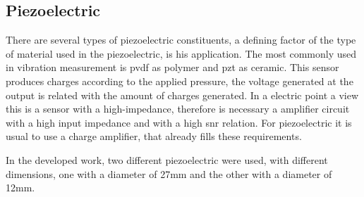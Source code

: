 \subsection{Piezoelectric}

There are several types of piezoelectric constituents, a defining factor of the type of material used in the piezoelectric, is his application. The most commonly used in vibration measurement is \acrshort{pvdf} as polymer and \acrshort{pzt} as ceramic. This sensor produces charges according to the applied pressure, the voltage generated at the output is related with the amount of charges generated. In a electric point a view this is a sensor with a high-impedance, therefore is necessary a amplifier circuit with a high input impedance and with a high \acrshort{snr} relation. For piezoelectric it is usual to use a charge amplifier, that already fills these requirements.

In the developed work, two different piezoelectric were used, with different dimensions, one with a diameter of 27mm and the other with a diameter of 12mm.

